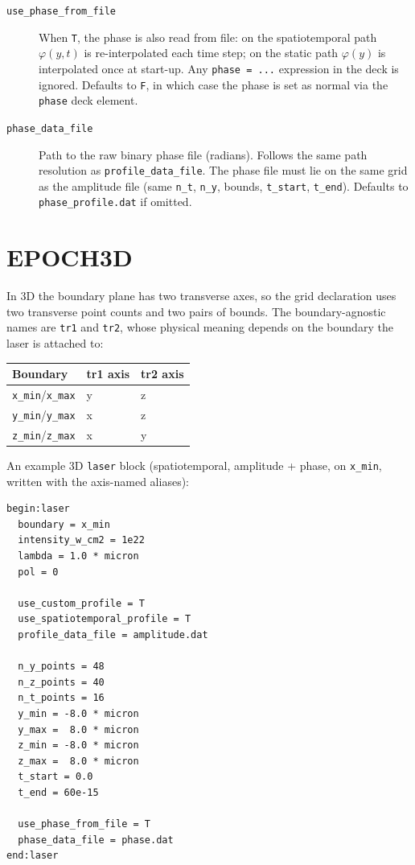 \documentclass[11pt,a4paper]{article}
\begin{document}
\begin{description}
  \item[\texttt{use\_phase\_from\_file}] When \texttt{T}, the phase is
    also read from file: on the spatiotemporal path $\varphi(y, t)$ is
    re-interpolated each time step; on the static path $\varphi(y)$ is
    interpolated once at start-up. Any \texttt{phase = ...} expression in
    the deck is ignored. Defaults to \texttt{F}, in which case the phase
    is set as normal via the \texttt{phase} deck element.

  \item[\texttt{phase\_data\_file}] Path to the raw binary phase file
    (radians). Follows the same path resolution as
    \texttt{profile\_data\_file}. The phase file must lie on the same
    grid as the amplitude file (same \texttt{n\_t}, \texttt{n\_y},
    bounds, \texttt{t\_start}, \texttt{t\_end}). Defaults to
    \texttt{phase\_profile.dat} if omitted.
\end{description}

\section{EPOCH3D}

In 3D the boundary plane has two transverse axes, so the grid declaration
uses two transverse point counts and two pairs of bounds. The
boundary-agnostic names are \texttt{tr1} and \texttt{tr2}, whose physical
meaning depends on the boundary the laser is attached to:

\begin{table}[h]
\centering
\begin{tabular}{@{}lll@{}}
\toprule
Boundary & tr1 axis & tr2 axis \\
\midrule
\texttt{x\_min}/\texttt{x\_max} & y & z \\
\texttt{y\_min}/\texttt{y\_max} & x & z \\
\texttt{z\_min}/\texttt{z\_max} & x & y \\
\bottomrule
\end{tabular}
\end{table}

An example 3D \texttt{laser} block (spatiotemporal, amplitude + phase, on
\texttt{x\_min}, written with the axis-named aliases):

\begin{lstlisting}[style=deck]
begin:laser
  boundary = x_min
  intensity_w_cm2 = 1e22
  lambda = 1.0 * micron
  pol = 0

  use_custom_profile = T
  use_spatiotemporal_profile = T
  profile_data_file = amplitude.dat

  n_y_points = 48
  n_z_points = 40
  n_t_points = 16
  y_min = -8.0 * micron
  y_max =  8.0 * micron
  z_min = -8.0 * micron
  z_max =  8.0 * micron
  t_start = 0.0
  t_end = 60e-15

  use_phase_from_file = T
  phase_data_file = phase.dat
end:laser
\end{lstlisting}
\end{document}
